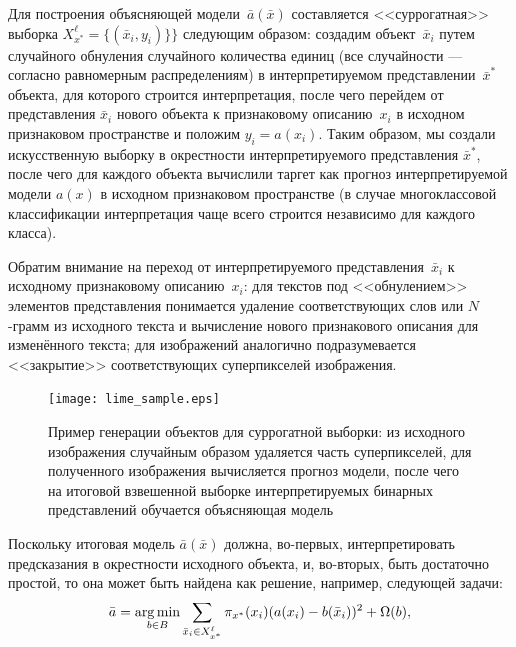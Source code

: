 \documentclass[12pt,a4paper]{article}
\begin{document}
	\par Для построения объясняющей модели~$\bar{a}(\bar{x})$ составляется <<суррогатная>> выборка $X_{x^*}^\ell = \{ (\bar{x}_i, y_i) \}\}$ следующим образом: создадим объект~$\bar{x}_i$ путем случайного обнуления случайного количества единиц (все случайности — согласно равномерным распределениям) в интерпретируемом представлении~$\bar{x}^*$ объекта, для которого строится интерпретация, после чего перейдем от представления $\bar{x}_i$ нового объекта к признаковому описанию~$x_i$ в исходном признаковом пространстве и положим $y_i = a(x_i)$. Таким образом, мы создали искусственную выборку в окрестности интерпретируемого представления $\bar{x}^*$, после чего для каждого объекта вычислили таргет как прогноз интерпретируемой модели $a(x)$ в исходном признаковом пространстве (в случае многоклассовой классификации интерпретация чаще всего строится независимо для каждого класса).
	\par Обратим внимание на переход от интерпретируемого представления~$\bar{x}_i$ к исходному признаковому описанию~$x_i$: для текстов под <<обнулением>> элементов представления понимается удаление соответствующих слов или $N$-грамм из исходного текста и вычисление нового признакового описания для изменённого текста; для изображений аналогично подразумевается <<закрытие>> соответствующих суперпикселей изображения.
	
	\begin{center}
		\begin{figure}[!htb]
			\centering
			\texttt{[image: lime\_sample.eps]}
			\caption{Пример генерации объектов для суррогатной выборки: из исходного изображения случайным образом удаляется часть суперпикселей, для полученного изображения вычисляется прогноз модели, после чего на итоговой взвешенной выборке интерпретируемых бинарных представлений обучается объясняющая модель}
		\end{figure}
	\end{center}
	
	\par Поскольку итоговая модель $\bar{a}(\bar{x})$ должна, во-первых, интерпретировать предсказания в окрестности исходного объекта, и, во-вторых, быть достаточно простой, то она может быть найдена как решение, например, следующей задачи:
	\[
	\bar{a} = \mathop{\rm arg\,min}\limits_{b \in B} \sum_{\bar{x}_i \in X_{x^*}^\ell} \pi_{x^*} (x_i) (a(x_i) - b(\bar{x}_i))^2 + \Omega(b),
	\]
	
\end{document}
